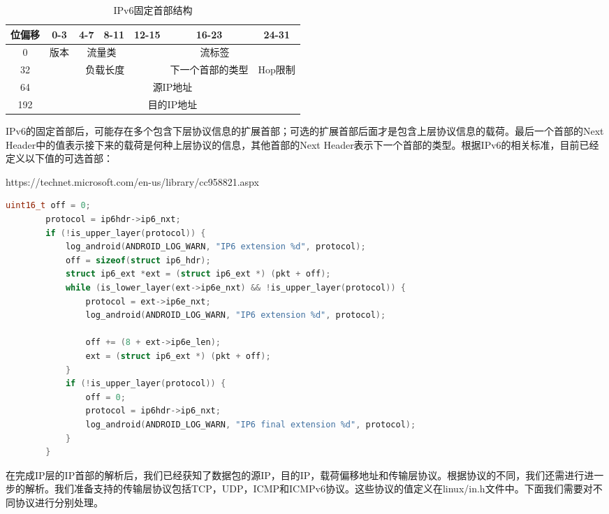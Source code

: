 \documentclass[format=final, language=chinese, degree=fyp]{hustthesis}
\begin{document}
\begin{table}[h!]
\centering
\caption{IPv6固定首部结构}\label{tab:1}
\begin{tabular}{|c|c|c|c|c|c|c|}
	\hline
	位偏移 & 0-3 & 4-7 & 8-11 & 12-15 & 16-23 & 24-31\\
	\hline
	0 & 版本 & \multicolumn{2}{c|}{流量类} & \multicolumn{3}{c|}{流标签}\\
	\hline
	32 & \multicolumn{4}{c|}{负载长度} & 下一个首部的类型 & Hop限制 \\
	\hline
	64 & \multicolumn{6}{c|}{源IP地址} \\
	\hline
	192 & \multicolumn{6}{c|}{目的IP地址} \\
	\hline
\end{tabular}
\end{table}




IPv6的固定首部后，可能存在多个包含下层协议信息的扩展首部；可选的扩展首部后面才是包含上层协议信息的载荷。最后一个首部的Next Header中的值表示接下来的载荷是何种上层协议的信息，其他首部的Next Header表示下一个首部的类型。根据IPv6的相关标准，目前已经定义以下值的可选首部：



https://technet.microsoft.com/en-us/library/cc958821.aspx


\begin{lstlisting}[language=c]
        uint16_t off = 0;
        protocol = ip6hdr->ip6_nxt;
        if (!is_upper_layer(protocol)) {
            log_android(ANDROID_LOG_WARN, "IP6 extension %d", protocol);
            off = sizeof(struct ip6_hdr);
            struct ip6_ext *ext = (struct ip6_ext *) (pkt + off);
            while (is_lower_layer(ext->ip6e_nxt) && !is_upper_layer(protocol)) {
                protocol = ext->ip6e_nxt;
                log_android(ANDROID_LOG_WARN, "IP6 extension %d", protocol);

                off += (8 + ext->ip6e_len);
                ext = (struct ip6_ext *) (pkt + off);
            }
            if (!is_upper_layer(protocol)) {
                off = 0;
                protocol = ip6hdr->ip6_nxt;
                log_android(ANDROID_LOG_WARN, "IP6 final extension %d", protocol);
            }
        }
\end{lstlisting}

在完成IP层的IP首部的解析后，我们已经获知了数据包的源IP，目的IP，载荷偏移地址和传输层协议。根据协议的不同，我们还需进行进一步的解析。我们准备支持的传输层协议包括TCP，UDP，ICMP和ICMPv6协议。这些协议的值定义在linux/in.h文件中。下面我们需要对不同协议进行分别处理。
\end{document}
